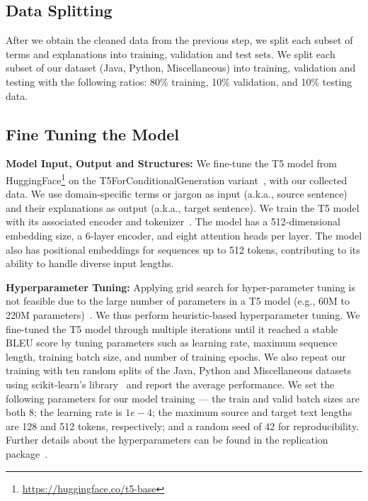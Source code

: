 \subsection{Data Splitting}
\label{Chap2:Methodology_datasplitting}

After we obtain the cleaned data from the previous step, we split each subset of terms and explanations into training, validation and test sets. We split each subset of our dataset (Java, Python, Miscellaneous) into training, validation and testing with the following ratios: 80\% training, 10\% validation, and 10\% testing data.

\subsection{Fine Tuning the Model}
\textbf{Model Input, Output and Structures:} 
We fine-tune the T5 model from HuggingFace\footnote{\url{https://huggingface.co/t5-base}} on the T5ForConditionalGeneration variant~\cite{huggingface_t5}, with our collected data. We use domain-specific terms or jargon as input (a.k.a., source sentence) and their explanations as output (a.k.a., target sentence). We train the T5 model with its associated encoder and tokenizer~\cite{raffel2020exploring}. The model has a 512-dimensional embedding size, a 6-layer encoder, and eight attention heads per layer. The model also has positional embeddings for sequences up to 512 tokens, contributing to its ability to handle diverse input lengths.

\textbf{Hyperparameter Tuning:} 
Applying grid search for hyper-parameter tuning is not feasible due to the large number of parameters in a T5 model (e.g., 60M to 220M parameters)~\cite{palivela2021optimization}. We thus perform heuristic-based hyperparameter tuning. We fine-tuned the T5 model through multiple iterations until it reached a stable BLEU score by tuning parameters such as learning rate, maximum sequence length, training batch size, and number of training epochs. We also repeat our training with ten random splits of the Java, Python and Miscellaneous datasets using scikit-learn's library~\cite{scikit} and report the average performance. We set the following parameters for our model training --- the train and valid batch sizes are both 8; the learning rate is $1e-4$; the maximum source and target text lengths are 128 and 512 tokens, respectively; and a random seed of 42 for reproducibility. Further details about the hyperparameters can be found in the replication package~\cite{bugenricherreplicationpackage}.

